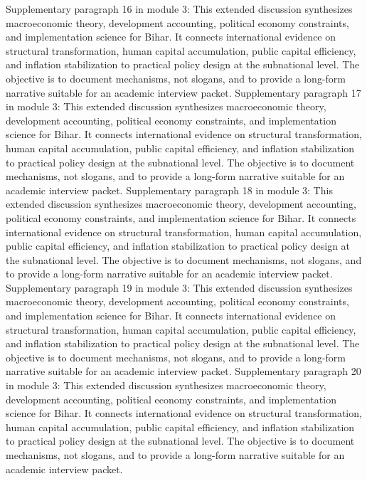 \documentclass[preprint,12pt]{elsarticle}
\begin{document}
Supplementary paragraph 16 in module 3: This extended discussion synthesizes macroeconomic theory, development accounting, political economy constraints, and implementation science for Bihar. It connects international evidence on structural transformation, human capital accumulation, public capital efficiency, and inflation stabilization to practical policy design at the subnational level. The objective is to document mechanisms, not slogans, and to provide a long-form narrative suitable for an academic interview packet.
Supplementary paragraph 17 in module 3: This extended discussion synthesizes macroeconomic theory, development accounting, political economy constraints, and implementation science for Bihar. It connects international evidence on structural transformation, human capital accumulation, public capital efficiency, and inflation stabilization to practical policy design at the subnational level. The objective is to document mechanisms, not slogans, and to provide a long-form narrative suitable for an academic interview packet.
Supplementary paragraph 18 in module 3: This extended discussion synthesizes macroeconomic theory, development accounting, political economy constraints, and implementation science for Bihar. It connects international evidence on structural transformation, human capital accumulation, public capital efficiency, and inflation stabilization to practical policy design at the subnational level. The objective is to document mechanisms, not slogans, and to provide a long-form narrative suitable for an academic interview packet.
Supplementary paragraph 19 in module 3: This extended discussion synthesizes macroeconomic theory, development accounting, political economy constraints, and implementation science for Bihar. It connects international evidence on structural transformation, human capital accumulation, public capital efficiency, and inflation stabilization to practical policy design at the subnational level. The objective is to document mechanisms, not slogans, and to provide a long-form narrative suitable for an academic interview packet.
Supplementary paragraph 20 in module 3: This extended discussion synthesizes macroeconomic theory, development accounting, political economy constraints, and implementation science for Bihar. It connects international evidence on structural transformation, human capital accumulation, public capital efficiency, and inflation stabilization to practical policy design at the subnational level. The objective is to document mechanisms, not slogans, and to provide a long-form narrative suitable for an academic interview packet.
\end{document}
